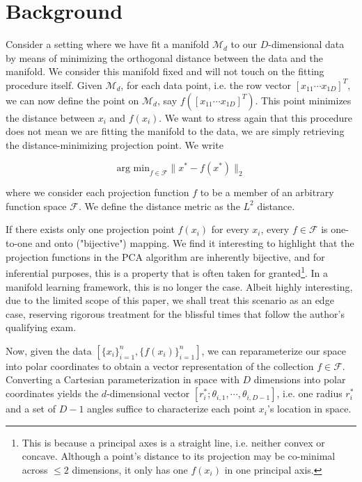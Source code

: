 \documentclass[twoside,11pt]{article}
\begin{document}
\section{Background}

Consider a setting where we have fit a manifold $\mathcal{M}_d$ to our $D$-dimensional data by means of minimizing the orthogonal distance between the data and the manifold. We consider this manifold fixed and will not touch on the fitting procedure itself. Given $\mathcal{M}_d$, for each data point, i.e. the row vector $[x_{11} \cdots x_{1D}]^T$, we can now define the point on $\mathcal{M}_d$, say $f\left(\left[x_{11} \cdots x_{1D}\right]^T\right)$. This point minimizes the distance between $x_i$ and $f(x_i)$. We want to stress again that this procedure does not mean we are fitting the manifold to the data, we are simply retrieving the distance-minimizing projection point. We write 

$$
\text{arg~min}_{f \in \mathcal{F}} \|x^* - f(x^*)\|_2
$$

where we consider each projection function $f$ to be a member of an arbitrary function space $\mathcal{F}$. We define the distance metric as the $L^2$ distance. 

If there exists only one projection point $f(x_i)$ for every $x_i$, every $f \in \mathcal{F}$ is one-to-one and onto ("bijective") mapping. We find it interesting to highlight that the projection functions in the PCA algorithm are inherently bijective, and for inferential purposes, this is a property that is often taken for granted\footnote{This is because a principal axes is a straight line, i.e. neither convex or concave. Although a point's distance to its projection may be co-minimal across $\leq 2$ dimensions, it only has one $f(x_i)$ in one principal axis.}. In a manifold learning framework, this is no longer the case. Albeit highly interesting, due to the limited scope of this paper, we shall treat this scenario as an edge case, reserving rigorous treatment for the blissful times that follow the author's qualifying exam. 

Now, given the data $[\{x_i\}_{i=1}^n, \{f(x_i)\}_{i=1}^n]$, we can reparameterize our space into polar coordinates to obtain a vector representation of the collection $f \in \mathcal{F}$. Converting a Cartesian parameterization in space with $D$ dimensions into polar coordinates yields the $d$-dimensional vector $[r_i^*; \theta_{i, 1}, \cdots, \theta_{i, D-1}]$, i.e. one radius $r_i^*$ and a set of $D-1$ angles suffice to characterize each point $x_i$'s location in space. 
\end{document}

